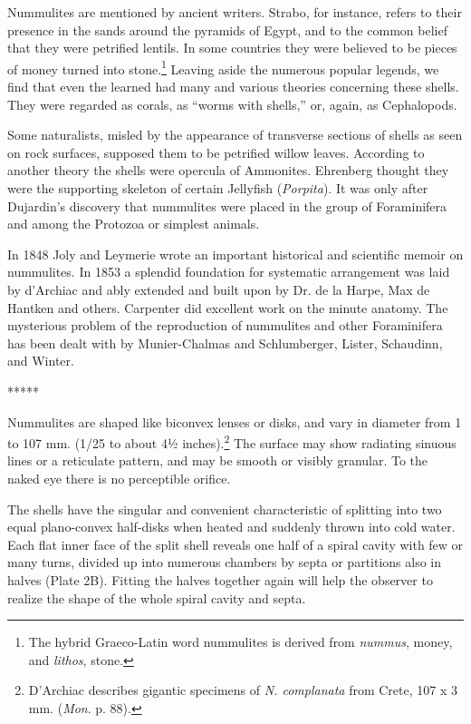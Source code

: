 \documentclass[a4paper, 12pt, oneside]{article}
\begin{document}
Nummulites are mentioned by ancient writers. Strabo, for instance, refers to their presence in the sands around the pyramids of Egypt, and to the common belief that they were petrified lentils. In some countries they were believed to be pieces of money turned into stone.\footnote{The hybrid Graeco-Latin word nummulites is derived from \emph{nummus}, money, and \emph{lithos}, stone.} Leaving aside the numerous popular legends, we find that even the learned had many and various theories concerning these shells. They were regarded as corals, as ``worms with shells,'' or, again, as Cephalopods.

Some naturalists, misled by the appearance of transverse sections of shells as seen on rock surfaces, supposed them to be petrified willow leaves. According to another theory the shells were opercula of Ammonites. Ehrenberg thought they were the supporting skeleton of certain Jellyfish (\emph{Porpita}). It was only after Dujardin's discovery that nummulites were placed in the group of Foraminifera and among the Protozoa or simplest animals.

In 1848 Joly and Leymerie wrote an important historical and scientific memoir on nummulites. In 1853 a splendid foundation for systematic arrangement was laid by d'Archiac and ably extended and built upon by Dr. de la Harpe, Max de Hantken and others. Carpenter did excellent work on the minute anatomy. The mysterious problem of the reproduction of nummulites and other Foraminifera has been dealt with by Munier-Chalmas and Schlumberger, Lister, Schaudinn, and Winter.

\centerline{*\hspace{15mm}*\hspace{15mm}*\hspace{15mm}*\hspace{15mm}*}
\bigskip

Nummulites are shaped like biconvex lenses or disks, and vary in diameter from 1 to 107 mm. (1/25 to about 4½ inches).\footnote{D'Archiac describes gigantic specimens of \emph{N. complanata} from Crete, 107 x 3 mm. (\emph{Mon}. p. 88).} The surface may show radiating sinuous lines or a reticulate pattern, and may be smooth or visibly granular. To the naked eye there is no perceptible orifice.

The shells have the singular and convenient characteristic of splitting into two equal plano-convex half-disks when heated and suddenly thrown into cold water. Each flat inner face of the split shell reveals one half of a spiral cavity with few or many turns, divided up into numerous chambers by septa or partitions also in halves (Plate 2B). Fitting the halves together again will help the observer to realize the shape of the whole spiral cavity and septa.
\end{document}
